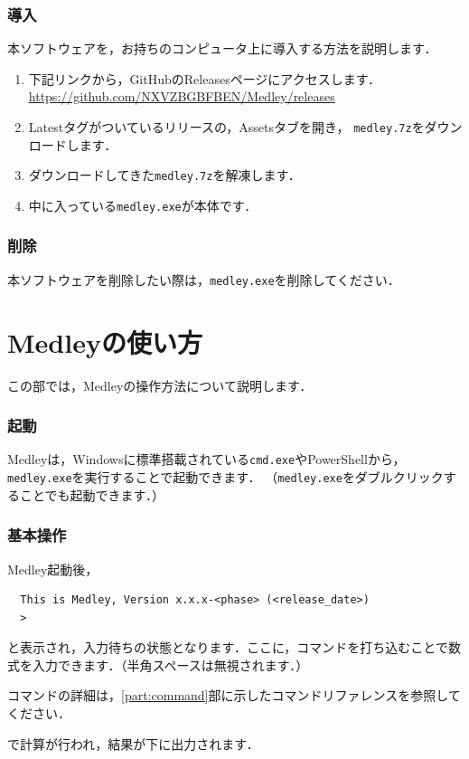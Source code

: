 \documentclass{ltjsarticle}
\begin{document}
    \section{導入}
    本ソフトウェアを，お持ちのコンピュータ上に導入する方法を説明します．
    \begin{enumerate}
        \item 下記リンクから，GitHubのReleasesページにアクセスします．\\
        \url{https://github.com/NXVZBGBFBEN/Medley/releases}
        \item \textsf{Latest}タグがついているリリースの，\textsf{Assets}タブを開き，
        \texttt{medley.7z}をダウンロードします．
        \item ダウンロードしてきた\texttt{medley.7z}を解凍します．
        \item 中に入っている\texttt{medley.exe}が本体です．
    \end{enumerate}


    \section{削除}
    本ソフトウェアを削除したい際は，\texttt{medley.exe}を削除してください．

    \newpage


    \part{Medleyの使い方}
    この部では，Medleyの操作方法について説明します．


    \section{起動}
    Medleyは，Windowsに標準搭載されている\texttt{cmd.exe}やPowerShellから，\texttt{medley.exe}を実行することで起動できます．
    （\texttt{medley.exe}をダブルクリックすることでも起動できます．）


    \section{基本操作}
    Medley起動後，
    \begin{lstlisting}
  This is Medley, Version x.x.x-<phase> (<release_date>)
  >
    \end{lstlisting}
    と表示され，入力待ちの状態となります．ここに，コマンドを打ち込むことで数式を入力できます．（半角スペースは無視されます．）\par
    コマンドの詳細は，\ref{part:command}部に示したコマンドリファレンスを参照してください．\par
    \Enter{}で計算が行われ，結果が下に出力されます．
\end{document}
